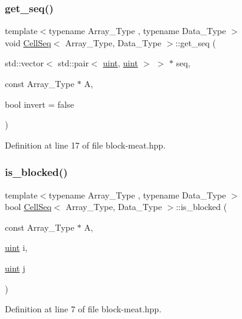 \subsubsection{\texorpdfstring{get\+\_\+seq()}{get\_seq()}}
{\footnotesize\ttfamily template$<$typename Array\+\_\+\+Type , typename Data\+\_\+\+Type $>$ \\
void \hyperlink{class_cell_seq}{Cell\+Seq}$<$ Array\+\_\+\+Type, Data\+\_\+\+Type $>$\+::get\+\_\+seq (\begin{DoxyParamCaption}\item[{std\+::vector$<$ std\+::pair$<$ \hyperlink{typedefs_8hpp_a91ad9478d81a7aaf2593e8d9c3d06a14}{uint}, \hyperlink{typedefs_8hpp_a91ad9478d81a7aaf2593e8d9c3d06a14}{uint} $>$ $>$ $\ast$}]{seq,  }\item[{const Array\+\_\+\+Type $\ast$}]{A,  }\item[{bool}]{invert = {\ttfamily false} }\end{DoxyParamCaption})\hspace{0.3cm}{\ttfamily [inline]}}



Definition at line 17 of file block-\/meat.\+hpp.

\mbox{\label{class_cell_seq_a32d85d2f118a68b58d1f7a6095ff42ca}} 
\subsubsection{\texorpdfstring{is\+\_\+blocked()}{is\_blocked()}}
{\footnotesize\ttfamily template$<$typename Array\+\_\+\+Type , typename Data\+\_\+\+Type $>$ \\
bool \hyperlink{class_cell_seq}{Cell\+Seq}$<$ Array\+\_\+\+Type, Data\+\_\+\+Type $>$\+::is\+\_\+blocked (\begin{DoxyParamCaption}\item[{const Array\+\_\+\+Type $\ast$}]{A,  }\item[{\hyperlink{typedefs_8hpp_a91ad9478d81a7aaf2593e8d9c3d06a14}{uint}}]{i,  }\item[{\hyperlink{typedefs_8hpp_a91ad9478d81a7aaf2593e8d9c3d06a14}{uint}}]{j }\end{DoxyParamCaption})\hspace{0.3cm}{\ttfamily [inline]}}



Definition at line 7 of file block-\/meat.\+hpp.



